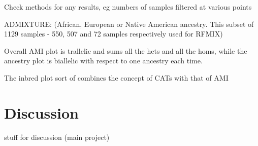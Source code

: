 \documentclass[11pt]{article}
\begin{document}
Check methods for any results, eg numbers of samples filtered at various points 

ADMIXTURE: (African, European or Native American ancestry. This subset of  1129 samples - 550, 507 and 72 samples respectively used for RFMIX)



Overall AMI plot is trallelic and sums all the hets and all the homs, while the ancestry plot is biallelic with respect to one ancestry each time.




The inbred plot sort of combines the concept of CATs with that of AMI













\section{Discussion}












stuff for discussion (main project)
\end{document}
